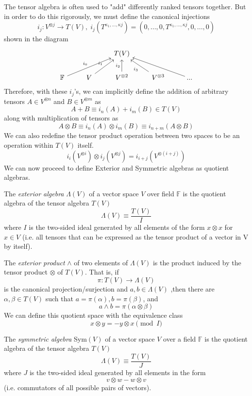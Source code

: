 \documentclass{article}
\begin{document}
  The tensor algebra is often used to "add" differently ranked tensors together. But in order to do this rigorously, we must define the canonical injections
  \[i_j: V^{\otimes j} \longrightarrow T(V), \; i_j (T^{\kappa_1, ..., \kappa j}) = (0, ...,0, T^{\kappa_1, ..., \kappa j}, 0, ..., 0) \]
  shown in the diagram
  \[\begin{tikzcd}
      & & T(V) & & \\
      \mathbb{F} \arrow{urr}{i_0} & V \arrow{ur}{i_1} & V^{\otimes 2} \arrow{u}{i_2} & V^{\otimes 3} \arrow{ul}{i_3} & ... \arrow{ull}
  \end{tikzcd}\]
  Therefore, with these $i_j$'s, we can implicitly define the addition of arbitrary tensors $A \in V^{\otimes n}$ and $B \in V^{\otimes m}$ as 
  \[ A + B \equiv i_n (A) + i_m (B) \in T(V)\]
  along with multiplication of tensors as
  \[ A \otimes B \equiv i_n(A) \otimes i_m(B) \equiv i_{n+m} (A \otimes B)\]
  We can also redefine the tensor product operation between two spaces to be an operation within $T(V)$ itself. 
  \[i_i(V^{\otimes i}) \otimes i_j( V^{\otimes j}) = i_{i+j} (V^{\otimes (i+j)})\]
  We can now proceed to define Exterior and Symmetric algebras as quotient algebras. 

  \begin{definition}
  The \textit{exterior algebra} $\Lambda(V)$ of a vector space $V$ over field $\mathbb{F}$ is the quotient algebra of the tensor algebra $T(V)$
  \[\Lambda(V) \equiv \frac{T(V)}{I}\]
  where $I$ is the two-sided ideal generated by all elements of the form $x \otimes x$ for $x \in V$ (i.e. all tensors that can be expressed as the tensor product of a vector in V by itself). 

  The \textit{exterior product} $\wedge$ of two elements of $\Lambda(V)$ is the product induced by the tensor product $\otimes$ of $T(V)$. That is, if 
  \[\pi: T(V) \longrightarrow \Lambda(V)\]
  is the canonical projection/surjection and $a, b \in \Lambda(V)$ ,then there are $\alpha, \beta \in T(V)$ such that $a = \pi(\alpha), b = \pi(\beta)$, and 
  \[a \wedge b = \pi(\alpha \otimes \beta)\]
  We can define this quotient space with the equivalence class
  \[x \otimes y = - y \otimes x \pmod{I}\]
  \end{definition}

  \begin{definition}
  The \textit{symmetric algebra} Sym$(V)$ of a vector space $V$ over a field $\mathbb{F}$ is the quotient algebra of the tensor algebra $T(V)$ 
  \[\Lambda(V) \equiv \frac{T(V)}{J}\]
  where $J$ is the two-sided ideal generated by all elements in the form 
  \[v \otimes w - w \otimes v\]
  (i.e. commutators of all possible pairs of vectors). 
  \end{definition}
\end{document}
